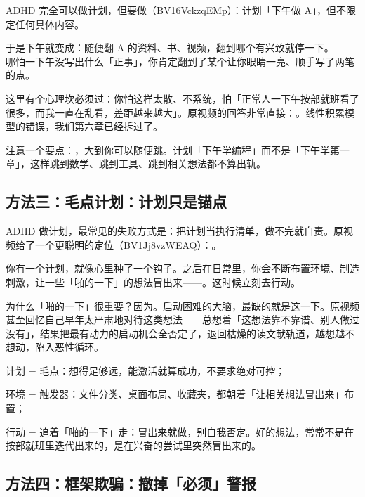 ADHD 完全可以做计划，但要做（BV16VckzqEMp）：计划「下午做 A」，但不限定任何具体内容。

于是下午就变成：随便翻 A 的资料、书、视频，翻到哪个有兴致就停一下。——哪怕一下午没写出什么「正事」，你肯定翻到了某个让你眼睛一亮、顺手写了两笔的点。

这里有个心理坎必须过：你怕这样太散、不系统，怕「正常人一下午按部就班看了很多，而我一直在乱看，差距越来越大」。原视频的回答非常直接：。线性积累模型的错误，我们第六章已经拆过了。

注意一个要点：，大到你可以随便跳。计划「下午学编程」而不是「下午学第一章」，这样跳到数学、跳到工具、跳到相关想法都不算出轨。

\subsection{方法三：毛点计划：计划只是锚点}

ADHD 做计划，最常见的失败方式是：把计划当执行清单，做不完就自责。原视频给了一个更聪明的定位（BV1Jj8vzWEAQ）：。

你有一个计划，就像心里种了一个钩子。之后在日常里，你会不断布置环境、制造刺激，让一些「啪的一下」的想法冒出来——。这时候立刻去行动。

为什么「啪的一下」很重要？因为。启动困难的大脑，最缺的就是这一下。原视频甚至回忆自己早年太严肃地对待这类想法——总想着「这想法靠不靠谱、别人做过没有」，结果把最有动力的启动机会全否定了，退回枯燥的读文献轨道，越想越不想动，陷入恶性循环。

\begin{checklist}
  \item 计划 = 毛点：想得足够远，能激活就算成功，不要求绝对可控；
  \item 环境 = 触发器：文件分类、桌面布局、收藏夹，都朝着「让相关想法冒出来」布置；
  \item 行动 = 追着「啪的一下」走：冒出来就做，别自我否定。好的想法，常常不是在按部就班里迭代出来的，是在兴奋的尝试里突然冒出来的。
\end{checklist}

\subsection{方法四：框架欺骗：撤掉「必须」警报}

